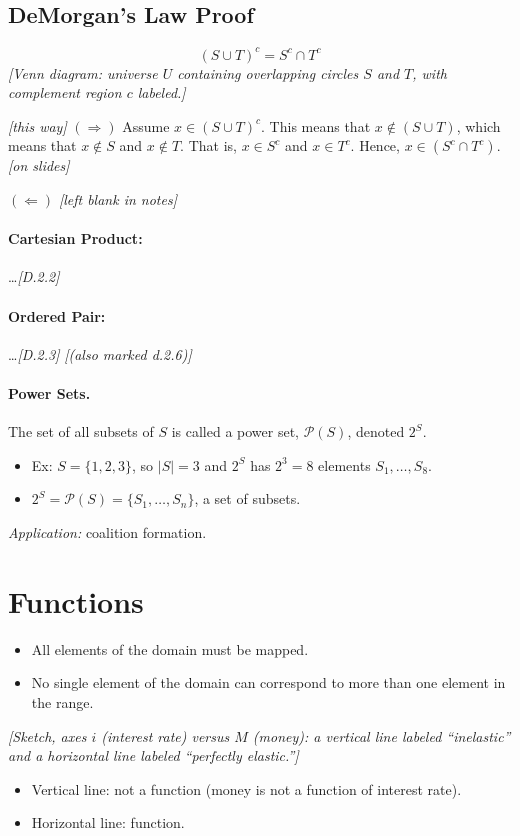 \documentclass[11pt]{article}
\newcommand{\note}[1]{\textcolor{red!60!black}{\textit{[#1]}}}
\newcommand{\P}{\mathcal{P}}
\begin{document}
\subsection*{DeMorgan's Law Proof}
\[
  (S \cup T)^c = S^c \cap T^c
\]
\note{Venn diagram: universe $U$ containing overlapping circles $S$ and $T$, with complement region $c$ labeled.}

\note{this way} $(\Rightarrow)$ Assume $x \in (S \cup T)^c$. This means that $x \notin (S \cup T)$, which means that $x \notin S$ and $x \notin T$. That is, $x \in S^c$ and $x \in T^c$. Hence, $x \in (S^c \cap T^c)$. \note{on slides}

$(\Leftarrow)$ \note{left blank in notes}

\paragraph{Cartesian Product:} \ldots \quad \note{D.2.2}
\paragraph{Ordered Pair:} \ldots \quad \note{D.2.3}
\note{(also marked d.2.6)}

\paragraph{Power Sets.} The set of all subsets of $S$ is called a power set, $\P(S)$, denoted $2^S$.
\begin{itemize}
  \item Ex: $S = \{1,2,3\}$, so $|S| = 3$ and $2^S$ has $2^3 = 8$ elements $S_1, \ldots, S_8$.
  \item $2^S = \P(S) = \{S_1, \ldots, S_n\}$, a set of subsets.
\end{itemize}
\textit{Application:} coalition formation.

\section{Functions}

\begin{itemize}
  \item All elements of the domain must be mapped.
  \item No single element of the domain can correspond to more than one element in the range.
\end{itemize}

\note{Sketch, axes $i$ (interest rate) versus $M$ (money): a vertical line labeled ``inelastic'' and a horizontal line labeled ``perfectly elastic.''}
\begin{itemize}
  \item Vertical line: not a function (money is not a function of interest rate).
  \item Horizontal line: function.
\end{itemize}
\end{document}
